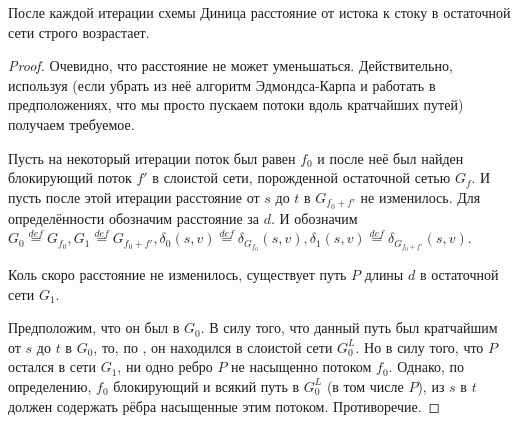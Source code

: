  После каждой итерации схемы Диница расстояние от истока к стоку в остаточной сети строго возрастает.
\begin{proof}

    Очевидно, что расстояние не может уменьшаться. Действительно, используя  (если убрать из неё алгоритм Эдмондса-Карпа и работать в предположениях, что мы просто пускаем потоки вдоль кратчайших путей) получаем требуемое.

    Пусть на некоторый итерации поток был равен $f_0$ и после неё был найден блокирующий поток $f'$ в слоистой сети, порожденной остаточной сетью $G_f$.
    И пусть после этой итерации расстояние от $s$ до $t$ в $G_{f_0 + f'}$ не изменилось. Для определённости обозначим расстояние за $d$. И обозначим $G_0 \overset{def}{=} G_{f_0}, G_1 \overset{def}{=} G_{f_0 + f'}, \delta_0(s, v) \overset{def}{=} \delta_{G_{f_0}}(s, v), \delta_1(s, v) \overset{def}{=} \delta_{G_{f_0 + f'}}(s, v)$.

    Коль скоро расстояние не изменилось, существует путь $P$ длины $d$ в остаточной сети $G_1$. 

    Предположим, что он был в $G_0$. В силу того, что данный путь был кратчайшим от $s$ до $t$ в $G_0$, то, по , он находился в слоистой сети $G^L_0$.
    Но в силу того, что $P$ остался в сети $G_1$, ни одно ребро $P$ не насыщенно потоком $f_0$. Однако, по определению, $f_0$ блокирующий и всякий путь в $G_0^L$ (в том числе $P$), из $s$ в $t$ должен содержать рёбра насыщенные этим потоком. Противоречие.


\end{proof}
